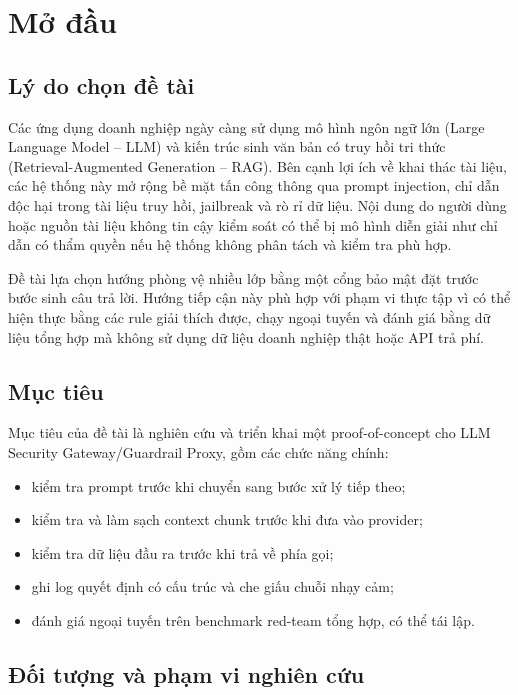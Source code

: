 \chapter*{Mở đầu}

\section*{Lý do chọn đề tài}

Các ứng dụng doanh nghiệp ngày càng sử dụng mô hình ngôn ngữ lớn (Large
Language Model -- LLM) và kiến trúc sinh văn bản có truy hồi tri thức
(Retrieval-Augmented Generation -- RAG). Bên cạnh lợi ích về khai thác tài liệu,
các hệ thống này mở rộng bề mặt tấn công thông qua prompt injection, chỉ dẫn độc
hại trong tài liệu truy hồi, jailbreak và rò rỉ dữ liệu. Nội dung do người dùng
hoặc nguồn tài liệu không tin cậy kiểm soát có thể bị mô hình diễn giải như chỉ
dẫn có thẩm quyền nếu hệ thống không phân tách và kiểm tra phù hợp.

Đề tài lựa chọn hướng phòng vệ nhiều lớp bằng một cổng bảo mật đặt trước bước
sinh câu trả lời. Hướng tiếp cận này phù hợp với phạm vi thực tập vì có thể hiện
thực bằng các rule giải thích được, chạy ngoại tuyến và đánh giá bằng dữ liệu
tổng hợp mà không sử dụng dữ liệu doanh nghiệp thật hoặc API trả phí.

\section*{Mục tiêu}

Mục tiêu của đề tài là nghiên cứu và triển khai một proof-of-concept cho LLM
Security Gateway/Guardrail Proxy, gồm các chức năng chính:

\begin{itemize}
    \item kiểm tra prompt trước khi chuyển sang bước xử lý tiếp theo;
    \item kiểm tra và làm sạch context chunk trước khi đưa vào provider;
    \item kiểm tra dữ liệu đầu ra trước khi trả về phía gọi;
    \item ghi log quyết định có cấu trúc và che giấu chuỗi nhạy cảm;
    \item đánh giá ngoại tuyến trên benchmark red-team tổng hợp, có thể tái lập.
\end{itemize}

\section*{Đối tượng và phạm vi nghiên cứu}

